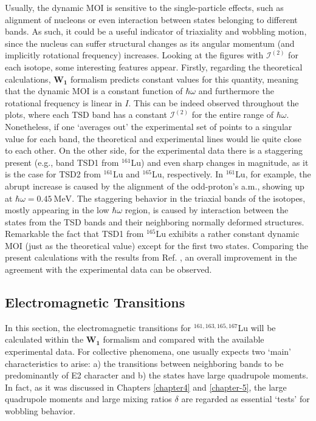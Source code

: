 Usually, the dynamic MOI is sensitive to the single-particle effects, such as alignment of nucleons or even interaction between states belonging to different bands. As such, it could be a useful indicator of triaxiality and wobbling motion, since the nucleus can suffer structural changes as its angular momentum (and implicitly rotational frequency) increases. Looking at the figures with $\mathcal{I}^{(2)}$ for each isotope, some interesting features appear. Firstly, regarding the theoretical calculations, $\mathbf{W_1}$ formalism predicts constant values for this quantity, meaning that the dynamic MOI is a constant function of $\hbar\omega$ and furthermore the rotational frequency is linear in $I$. This can be indeed observed throughout the plots, where each TSD band has a constant $\mathcal{I}^{(2)}$ for the entire range of $\hbar\omega$. Nonetheless, if one `averages out' the experimental set of points to a singular value for each band, the theoretical and experimental lines would lie quite close to each other. On the other side, for the experimental data there is a staggering present (e.g., band TSD1 from $^{161}$Lu) and even sharp changes in magnitude, as it is the case for TSD2 from $^{161}$Lu and $^{165}$Lu, respectively. In $^{161}$Lu, for example, the abrupt increase is caused by the alignment of the odd-proton's a.m., showing up at $\hbar\omega=0.45\ \text{MeV}$. The staggering behavior in the triaxial bands of the isotopes, mostly appearing in the low $\hbar\omega$ region, is caused by interaction between the states from the TSD bands and their neighboring normally deformed structures. Remarkable the fact that TSD1 from $^{165}$Lu exhibits a rather constant dynamic MOI (just as the  theoretical value) except for the first two states. Comparing the present calculations with the results from Ref. \cite{raduta2018wobbling}, an overall improvement in the agreement with the experimental data can be observed.

\subsection{Electromagnetic Transitions}

In this section, the electromagnetic transitions for $^{161,163,165,167}$Lu will be calculated within the $\mathbf{W_1}$ formalism and compared with the available experimental data. For collective phenomena, one usually expects two `main' characteristics to arise: a) the transitions between neighboring bands to be predominantly of E2 character and b) the states have large quadrupole moments. In fact, as it was discussed in Chapters \ref{chapter4} and \ref{chapter-5}, the large quadrupole moments and large mixing ratios $\delta$ are regarded as essential `tests' for wobbling behavior.

